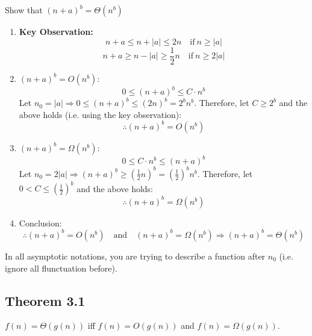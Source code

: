    \begin{example}
        Show that $(n + a)^b = \Theta(n^b)$
        \begin{enumerate}
            \item \textbf{Key Observation:}
                \[
                n + a \leq n + |a| \leq 2n \quad \text{if} \ n \geq |a|
                \]
                \[
                n + a \geq n - |a| \geq \frac{1}{2} n \quad \text{if} \ n \geq 2|a|
                \]
            
            \item $(n + a)^b = O(n^b):$
            \[
            0 \leq (n + a)^b \leq C \cdot n^b
            \]
            Let $n_0 = |a| \Rightarrow 0 \leq (n + a)^b \leq (2n)^b = 2^b n^b$.
            Therefore, let $C \geq 2^b$ and the above holds (i.e. using the key observation):
            \[
            \therefore (n + a)^b = O(n^b)
            \]

            \item $(n + a)^b = \Omega(n^b):$
            \[
            0 \leq C \cdot n^b \leq (n + a)^b
            \]
            Let $n_0 = 2|a| \Rightarrow (n + a)^b \geq \left(\frac{1}{2} n \right)^b = \left(\frac{1}{2} \right)^b n^b$.
            Therefore, let $0 < C \leq \left(\frac{1}{2}\right)^b$ and the above holds:
            \[
            \therefore (n + a)^b = \Omega(n^b)
            \]

            \item Conclusion:
            \[
            \therefore (n + a)^b = O(n^b) \quad \text{and} \quad (n + a)^b = \Omega(n^b) \Rightarrow (n + a)^b = \Theta(n^b)
            \]
            \end{enumerate}
    \end{example}


\begin{intuition}
    In all asymptotic notations, you are trying to describe a function after $n_0$ (i.e. ignore all flunctuation before).
\end{intuition}

\subsection{Theorem 3.1}
    \begin{theorem}
        $f(n) = \Theta(g(n))$ iff $f(n) = O(g(n))$ and $f(n)=\Omega(g(n))$.
    \end{theorem}

